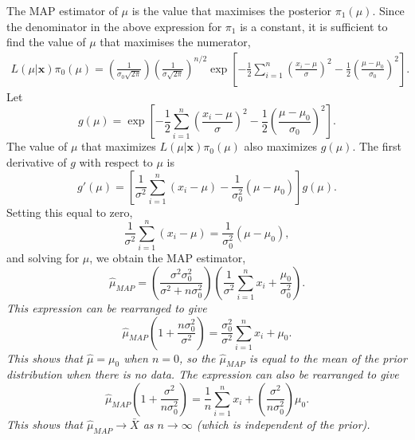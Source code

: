 \begin{exercise}
\begin{questions}
\begin{answer}
The MAP estimator of $\mu$ is the value that maximises the posterior $\pi_1(\mu)$. Since the denominator in the above expression for $\pi_1$ is a constant, it is sufficient to find the value of $\mu$ that maximises the numerator,
\begin{align*}
L(\mu|\mathbf{x})\pi_0(\mu)
	= \left(\frac{1}{\sigma_0\sqrt{2\pi}}\right)\left(\frac{1}{\sigma\sqrt{2\pi}}\right)^{n/2}
			\exp\left[-\frac{1}{2}\sum_{i=1}^n\left(\frac{x_i-\mu}{\sigma}\right)^2 -\frac{1}{2}\left(\frac{\mu-\mu_0}{\sigma_0}\right)^2\right].
\end{align*}
Let 
\[
g(\mu) = \exp\left[-\frac{1}{2}\sum_{i=1}^n\left(\frac{x_i-\mu}{\sigma}\right)^2 -\frac{1}{2}\left(\frac{\mu-\mu_0}{\sigma_0}\right)^2\right].
\]
The value of $\mu$ that maximizes $L(\mu|\mathbf{x})\pi_0(\mu)$ also maximizes $g(\mu)$. The first derivative of $g$ with respect to $\mu$ is
\[
g'(\mu) = \left[\frac{1}{\sigma^2}\sum_{i=1}^n (x_i-\mu) - \frac{1}{\sigma_0^2} (\mu-\mu_0)\right]g(\mu).
\]
Setting this equal to zero,
\[
\frac{1}{\sigma^2}\sum_{i=1}^n (x_i-\mu) = \frac{1}{\sigma_0^2}(\mu-\mu_0),
\]
and solving for $\mu$, we obtain the MAP estimator,
\[
\hat{\mu}_{MAP} = \left(\frac{\sigma^2\sigma_0^2}{\sigma^2+n\sigma_0^2}\right)\left(\frac{1}{\sigma^2}\sum_{i=1}^n x_i + \frac{\mu_0}{\sigma_0^2}\right).
\]
\bit
\it This expression can be rearranged to give
\[
\hat{\mu}_{MAP}\left(1 + \frac{n\sigma_0^2}{\sigma^2}\right) = \frac{\sigma_0^2}{\sigma^2}\sum_{i=1}^n x_i + \mu_0.
\]
This shows that $\hat{\mu}=\mu_0$ when $n=0$, so the $\hat{\mu}_{MAP}$ is equal to the mean of the prior distribution when there is no data. 
\it The expression can also be rearranged to give
\[
\hat{\mu}_{MAP}\left(1 + \frac{\sigma^2}{n\sigma_0^2}\right) = \frac{1}{n}\sum_{i=1}^n x_i + \left(\frac{\sigma^2}{n\sigma_0^2}\right)\mu_0.
\]
This shows that $\hat{\mu}_{MAP} \to \bar{X}$ as $n\to\infty$ (which is independent of the prior).
\eit
\end{answer}

\end{questions}
\end{exercise}


